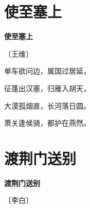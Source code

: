\documentclass[12pt,UTF-8,openany,fontset=none]{ctexbook}
\begin{document}
\vspace{8pt}
\clearpage

\section{使至塞上}


\begin{center}
    {\bfseries 使至塞上}

    \vspace{18pt}

    \begin{large}\xuwen
        〔王维〕
    \end{large}

\end{center}

    \vspace{18pt}  %

\begin{center}
    \begin{Large}

        单车欲问边，属国过居延，

        征蓬出汉塞，归雁入胡天，

        大漠孤烟直，长河落日圆。

        萧关逢侯骑，都护在燕然。

    \end{Large}

\end{center}

\vspace{8pt}
\clearpage

\section{渡荆门送别}


\begin{center}
    {\bfseries 渡荆门送别}

    \vspace{18pt}

    \begin{large}\xuwen
        〔李白〕
    \end{large}

\end{center}

    \vspace{18pt}  %
\end{document}
